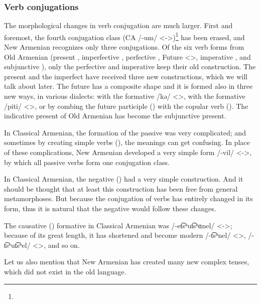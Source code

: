 \subsubsection{Verb conjugations}
The morphological changes in verb conjugation are much larger. First and foremost, the fourth conjugation class (CA /-um/ <->)\footnote{} has been erased, and New Armenian recognizes only three conjugations. Of the six verb forms from Old Armenian (present , imperfective , perfective , Future <>, imperative , and subjunctive ), only the perfective and imperative keep their old construction. The present and the imperfect have received three new constructions, which we will talk about later. The future has a composite shape and it is formed also in three new ways, in various dialects: with the formative /kə/ <>, with the formative /piti/ <>, or by combing the future participle () with the copular verb (). The indicative present of Old Armenian has become the subjunctive present. 

In Classical Armenian, the formation of the passive was very complicated; and sometimes by creating simple verbs (), the meanings can get confusing. In place of these complications, New Armenian developed a very simple form /-vil/ <->, by which all passive verbs form one conjugation class.

In Classical Armenian, the negative () had a very simple construction. And it should be thought that at least this construction has been free from general metamorphoses. But because the conjugation of verbs has entirely changed in its form, thus it is natural that the negative would follow these changes. 

The causative () formative in Classical Armenian was /-et͡sʰut͡sʰɑnel/ <->; because of its great length, it has shortened and become modern /-t͡sʰnel/ <>, /-t͡sʰut͡sʰel/ <>, and so on. 

Let us also mention that New Armenian has created many new complex tenses, which did not exist in the old language.

\begin{adjarianpage}\label{page:23}\end{adjarianpage}%

